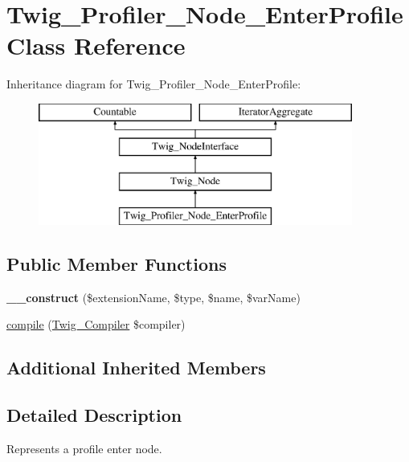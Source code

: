 \hypertarget{classTwig__Profiler__Node__EnterProfile}{}\section{Twig\+\_\+\+Profiler\+\_\+\+Node\+\_\+\+Enter\+Profile Class Reference}
\label{classTwig__Profiler__Node__EnterProfile}
Inheritance diagram for Twig\+\_\+\+Profiler\+\_\+\+Node\+\_\+\+Enter\+Profile\+:\begin{figure}[H]
\begin{center}
\leavevmode
\includegraphics[height=4.000000cm]{classTwig__Profiler__Node__EnterProfile}
\end{center}
\end{figure}
\subsection*{Public Member Functions}
\begin{DoxyCompactItemize}
\item 
{\bfseries \+\_\+\+\_\+construct} (\$extension\+Name, \$type, \$name, \$var\+Name)\hypertarget{classTwig__Profiler__Node__EnterProfile_aa74bd3a1d9f6061de02f650bd9d842ea}{}\label{classTwig__Profiler__Node__EnterProfile_aa74bd3a1d9f6061de02f650bd9d842ea}

\item 
\hyperlink{classTwig__Profiler__Node__EnterProfile_a01869f0ba21ff007bbac03f139f00058}{compile} (\hyperlink{classTwig__Compiler}{Twig\+\_\+\+Compiler} \$compiler)
\end{DoxyCompactItemize}
\subsection*{Additional Inherited Members}


\subsection{Detailed Description}
Represents a profile enter node.

